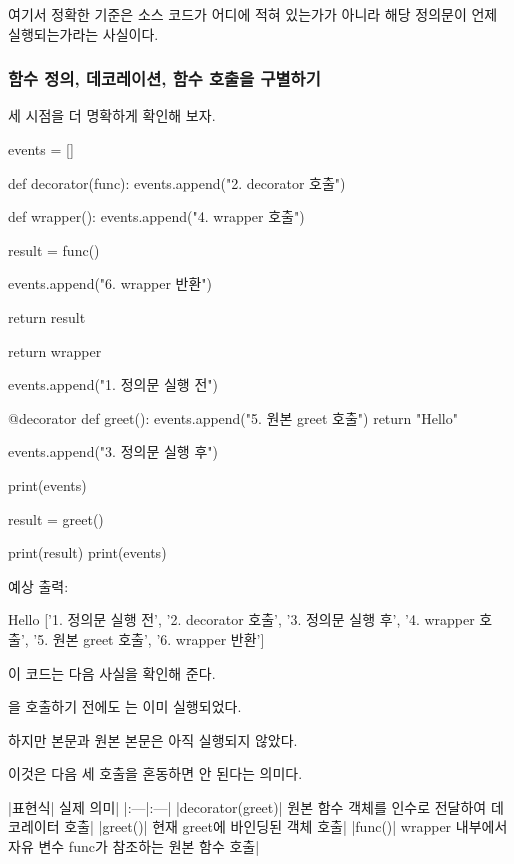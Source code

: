 여기서 정확한 기준은 소스 코드가 어디에 적혀 있는가가 아니라 해당 정의문이 언제 실행되는가라는 사실이다.

\subsubsection{함수 정의, 데코레이션, 함수 호출을 구별하기}

세 시점을 더 명확하게 확인해 보자.

\begin{dhkcode}
events = []


def decorator(func):
    events.append("2. decorator 호출")

    def wrapper():
        events.append("4. wrapper 호출")

        result = func()

        events.append("6. wrapper 반환")

        return result

    return wrapper


events.append("1. 정의문 실행 전")


@decorator
def greet():
    events.append("5. 원본 greet 호출")
    return "Hello"


events.append("3. 정의문 실행 후")

print(events)

result = greet()

print(result)
print(events)
\end{dhkcode}

예상 출력:

\begin{dhkzsh}
Hello
['1. 정의문 실행 전', '2. decorator 호출', '3. 정의문 실행 후', 
'4. wrapper 호출', '5. 원본 greet 호출', '6. wrapper 반환']
\end{dhkzsh}

이 코드는 다음 사실을 확인해 준다.

을 호출하기 전에도 는 이미 실행되었다.

하지만  본문과 원본  본문은 아직 실행되지 않았다.

이것은 다음 세 호출을 혼동하면 안 된다는 의미다.

\begin{dhktable}
|표현식|	실제 의미|
|:---|:---|
|decorator(greet)|	원본 함수 객체를 인수로 전달하여 데코레이터 호출|
|greet()|	현재 greet에 바인딩된 객체 호출|
|func()|	wrapper 내부에서 자유 변수 func가 참조하는 원본 함수 호출|
\end{dhktable}

